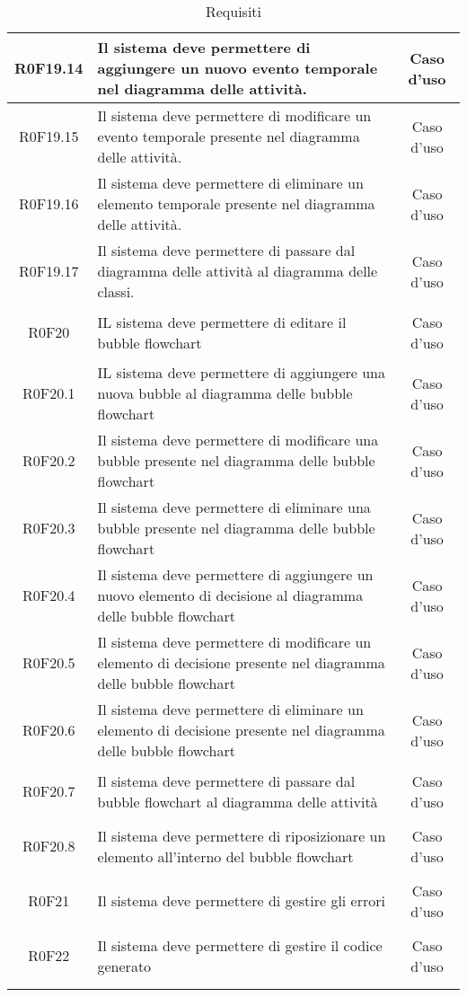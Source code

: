 \documentclass[../AnalisiDeiRequisiti.tex]{subfiles}
\begin{document}
\begin{longtable}{|c|>{\centering}p{7cm}|c|}
\hypertarget{R0F19.14}{R0F19.14} & Il sistema deve permettere di aggiungere un nuovo evento temporale nel diagramma delle attività. & Caso d'uso \\ \hline
\hypertarget{R0F19.15}{R0F19.15} & Il sistema deve permettere di modificare un evento temporale presente nel diagramma delle attività. & Caso d'uso \\ \hline
\hypertarget{R0F19.16}{R0F19.16} & Il sistema deve permettere di eliminare un elemento temporale presente nel diagramma delle attività. & Caso d'uso \\ \hline
\hypertarget{R0F19.17}{R0F19.17} & Il sistema deve permettere di passare dal diagramma delle attività al diagramma delle classi. & Caso d'uso \\ \hline
\hypertarget{R0F20}{R0F20} & IL sistema deve permettere di editare il bubble flowchart & Caso d'uso \\ \hline
\hypertarget{R0F20.1}{R0F20.1} & IL sistema deve permettere di aggiungere una nuova bubble al diagramma delle bubble flowchart & Caso d'uso \\ \hline
\hypertarget{R0F20.2}{R0F20.2} & Il sistema deve permettere di modificare una bubble presente nel diagramma delle bubble flowchart & Caso d'uso \\ \hline
\hypertarget{R0F20.3}{R0F20.3} & Il sistema deve permettere di eliminare una bubble presente nel diagramma delle bubble flowchart & Caso d'uso \\ \hline
\hypertarget{R0F20.4}{R0F20.4} & Il sistema deve permettere di aggiungere un nuovo elemento di decisione al diagramma delle bubble flowchart & Caso d'uso \\ \hline
\hypertarget{R0F20.5}{R0F20.5} & Il sistema deve permettere di modificare un elemento di decisione presente nel diagramma delle bubble flowchart & Caso d'uso \\ \hline
\hypertarget{R0F20.6}{R0F20.6} & Il sistema deve permettere di eliminare un elemento di decisione presente nel diagramma delle bubble flowchart & Caso d'uso \\ \hline
\hypertarget{R0F20.7}{R0F20.7} & Il sistema deve permettere di passare dal bubble flowchart al diagramma delle attività & Caso d'uso \\ \hline
\hypertarget{R0F20.8}{R0F20.8} & Il sistema deve permettere di riposizionare un elemento all'interno del bubble flowchart & Caso d'uso \\ \hline
\hypertarget{R0F21}{R0F21} & Il sistema deve permettere di gestire gli errori & Caso d'uso \\ \hline
\hypertarget{R0F22}{R0F22} & Il sistema deve permettere di gestire il codice generato & Caso d'uso \\ \hline
\caption[Requisiti]{Requisiti}
\label{tabella:req0}
\end{longtable}
\clearpage
\end{document}
